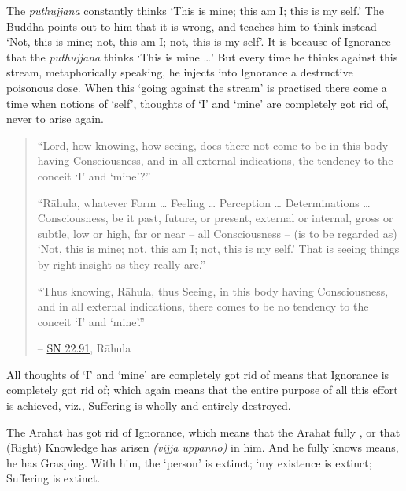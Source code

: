 The \emph{puthujjana} constantly thinks `This is mine; this am I; this is my self.' The Buddha points out to him that it is wrong, and teaches him to think instead `Not, this is mine; not, this am I; not, this is my self'. It is because of Ignorance that the \emph{puthujjana} thinks `This is mine \ldots\hspace{0pt}' But every time he thinks against this stream, metaphorically speaking, he injects into Ignorance a destructive poisonous dose. When this `going against the stream' is practised there come a time when  notions of `self',  thoughts of `I' and `mine' are completely got rid of, never to arise again.

\begin{quote}
``Lord, how knowing, how seeing, does there not come to be in this body having Consciousness, and in all external indications, the tendency to the conceit `I' and `mine'?''

``Rāhula, whatever Form \ldots\hspace{0pt} Feeling \ldots\hspace{0pt} Perception \ldots\hspace{0pt} Determinations \ldots\hspace{0pt} Consciousness, be it past, future, or present, external or internal, gross or subtle, low or high, far or near -- all Consciousness -- (is to be regarded as) `Not, this is mine; not, this am I; not, this is my self.' That is seeing things by right insight as they really are.''

``Thus knowing, Rāhula, thus Seeing, in this body having Consciousness, and in all external indications, there comes to be no tendency to the conceit `I' and `mine'.''

 -- \href{https://suttacentral.net/sn22.91/en/bodhi}{SN 22.91}, Rāhula
\end{quote}

All thoughts of `I' and `mine' are completely got rid of means that Ignorance is completely got rid of; which again means that the entire purpose of all this effort is achieved, viz., Suffering is wholly and entirely destroyed.

The Arahat has got rid of Ignorance, which means that the Arahat fully , or that (Right) Knowledge has arisen \emph{(vijjā uppanno)} in him. And he fully knows means, he has  Grasping. With him, the `person' is extinct; `my existence is extinct; Suffering is extinct.

